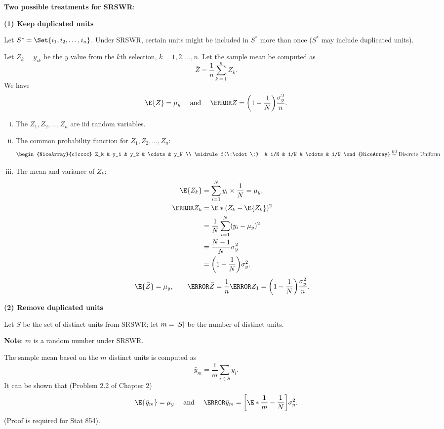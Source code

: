 \textbf{Two possible treatments for SRSWR}:

\textbf{(1) Keep duplicated units}

Let $ S^*=\Set{i_1,i_2,\ldots,i_n} $. Under SRSWR, certain units might be included in
$ S^* $ more than once ($ S^* $ may include duplicated units).

Let $ Z_k=y_{ik} $ be the $ y $ value from the $ k $th selection, $ k=1,2,\ldots,n $. Let
the sample mean be computed as
\[ \bar{Z}=\frac{1}{n}\sum_{k=1}^{n}Z_k. \]
We have
\[ \E{\bar{Z}}=\mu_y\quad\text{ and }\quad \V{\bar{Z}}=\biggl(1-\frac{1}{N}\biggr)\frac{\sigma_y^2}{n}. \]
\begin{enumerate}[(i)]
      \item The $ Z_1,Z_2,\ldots,Z_n $ are iid random variables.
      \item The common probability function for $ Z_1,Z_2,\ldots,Z_n $:
            \[ \begin{NiceArray}{c|cccc}
                        Z_k          & y_1 & y_2 & \cdots & y_N \\
                        \midrule
                        f(\:\cdot\:) & 1/N & 1/N & \cdots & 1/N
                  \end{NiceArray}\iid \text{Discrete Uniform} \]
      \item The mean and variance of $ Z_k $:
            \begin{align*}
                  \E{Z_k}
                   & =\sum_{i=1}^{N}y_i\times \frac{1}{N}=\mu_y. \\
                  \V{Z_k}
                   & =\E*{(Z_k-\E{Z_k})^2}                       \\
                   & =\frac{1}{N}\sum_{i=1}^{N}(y_i-\mu_y)^2     \\
                   & =\frac{N-1}{N}\sigma_y^2                    \\
                   & =\biggl(1-\frac{1}{N}\biggr)\sigma_y^2.
            \end{align*}
            \[ \E{\bar{Z}}=\mu_y,\qquad \V{\bar{Z}}=\frac{1}{n}\V{Z_1}=\biggl(1-\frac{1}{N}\biggr)\frac{\sigma_y^2}{n}. \]
\end{enumerate}
\textbf{(2) Remove duplicated units}

Let $ S $ be the set of distinct units from SRSWR\@; let $ m=\lvert S\rvert $ be the number of distinct units.

\textbf{Note}: $ m $ is a random number under SRSWR\@.

The sample mean based on the $ m $ distinct units is computed as
\[ \bar{y}_m=\frac{1}{m}\sum_{i\in S}y_i. \]
It can be shown that (Problem 2.2 of Chapter 2)
\[ \E{\bar{y}_m}=\mu_y\quad\text{ and }\quad \V{\bar{y}_m}=\biggl[\E*{\frac{1}{m}}-\frac{1}{N}\biggr]\sigma_y^2. \]
(Proof is required for Stat 854).

